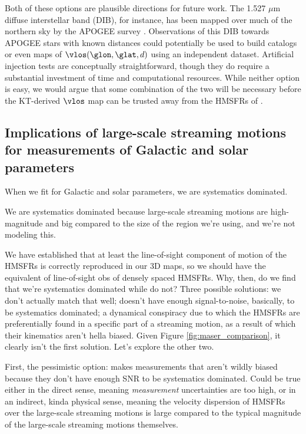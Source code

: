Both of these options are plausible directions for future work. 
The 1.527 $\mu$m diffuse interstellar band (DIB), for instance, has been mapped over much of the northern sky by the APOGEE survey \citep{2015ApJ...798...35Z}. 
Observations of this DIB towards APOGEE stars with known distances could potentially be used to build catalogs or even maps of $\vlos(\glon, \glat, d)$ using an independent dataset. 
Artificial injection tests are conceptually straightforward, though they do require a substantial investment of time and computational resources.
While neither option is easy, we would argue that some combination of the two will be necessary before the KT-derived $\vlos$ map can be trusted away from the HMSFRs of \Reid.

\subsection{Implications of large-scale streaming motions for measurements of Galactic and solar parameters}
\label{sec:discussion-plausibility}
When we fit for Galactic and solar parameters, we are systematics dominated.

We are systematics dominated because large-scale streaming motions are high-magnitude and big compared to the size of the region we're using, and we're not modeling this.

We have established that at least the line-of-sight component of motion of the HMSFRs is correctly reproduced in our 3D maps, so we should have the equivalent of line-of-sight obs of densely spaced HMSFRs. 
Why, then, do we find that we're systematics dominated while \citet{Reid} do not?
Three possible solutions: we don't actually match that well; \citet{Reid} doesn't have enough signal-to-noise, basically, to be systematics dominated; a dynamical conspiracy due to which the HMSFRs are preferentially found in a specific part of a streaming motion, as a result of which their kinematics aren't hella biased. 
Given Figure \ref{fig:maser_comparison}, it clearly isn't the first solution.
Let's explore the other two.

First, the pessimistic option: \citet{Reid} makes measurements that aren't wildly biased because they don't have enough SNR to be systematics dominated.
Could be true either in the direct sense, meaning \emph{measurement} uncertainties are too high, or in an indirect, kinda physical sense, meaning the velocity dispersion of HMSFRs over the large-scale streaming motions is large compared to the typical magnitude of the large-scale streaming motions themselves. 

